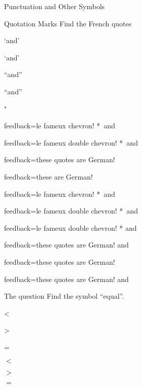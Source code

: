 \documentclass{article}
\begin{document}
\begin{quiz}[points=1,shuffle=false]{Punctuation and Other Symbols}
\begin{multi}[multiple]{Quotation Marks}
Find the French quotes
\item `and'
\item \textquoteleft and\textquoteright
\item ``and''
\item \textquotedblleft and\textquotedblright
\item \textquotesingle
\item "
\item \textquotedbl
\item[feedback={le fameux chevron!}]* \guilsinglleft\,and\,\guilsinglright
\item[feedback={le fameux double chevron!}]* 
\guillemotleft\,and\,\guillemotright
\item[feedback={these quotes are German!}] \quotesinglbase
\item[feedback={these are German!}] \quotedblbase 
\item[feedback={le fameux chevron!}]* \flq\,and\,\frq
\item[feedback={le fameux double chevron!}]* \flqq\,and\,\frqq
\item[feedback={le fameux double chevron!}]* \og and\fg
\item[feedback={these quotes are German!}] \glq and\grq
\item[feedback={these quotes are German!}] \dq
\item[feedback={these quotes are German!}] \glqq and\grqq
\end{multi}

\begin{cloze}{The question}
Find the symbol ``equal''.
\begin{multi}
\item <
\item >
\item* =
\end{multi}
\begin{multi}[vertical]
\item $<$
\item $>$
\item* $=$
\end{multi}
\end{cloze}

\end{quiz}
\end{document}
